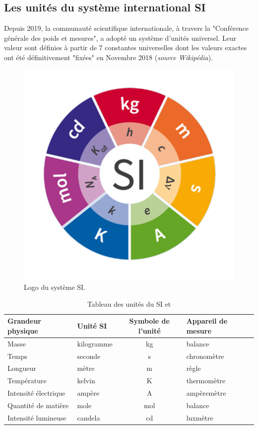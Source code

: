 \subsection{Les unités du système international SI}
Depuis 2019, la communauté scientifique internationale, à travers la "Conférence générale des poids et mesures", a adopté un système d'unités universel. Leur valeur sont définies à partir de 7 constantes universelles dont les valeurs exactes ont été définitivement "fixées" en Novembre 2018 (\textit{source Wikipédia}). 
\begin{figure}[!h]
    \centering\includegraphics[scale=0.4]{Images/Fiche_Methode1/SI_Logo_with_defining_constants.png}
    \caption{Logo du système SI. }
    \label{fig:Syteme_SI}
\end{figure}
\begin{table}[!h]
    \centering
    \begin{tabularx}{\textwidth}{| X | X | c | X |}  \hline
Grandeur physique & Unité SI & Symbole de l'unité & Appareil de mesure \\
\hline
Masse & kilogramme & kg & balance \\
Temps & seconde & s & chronomètre \\
Longueur & mètre & m & règle \\
Température & kelvin & K & thermomètre \\
Intensité électrique & ampère & A & ampèremètre \\
Quantité de matière & mole & mol & balance\\
Intensité lumineuse & candela & cd & luxmètre \\
\hline
\end{tabularx}
    \caption{Tableau des unités du SI et}
    \label{tab:SI}
\end{table}
